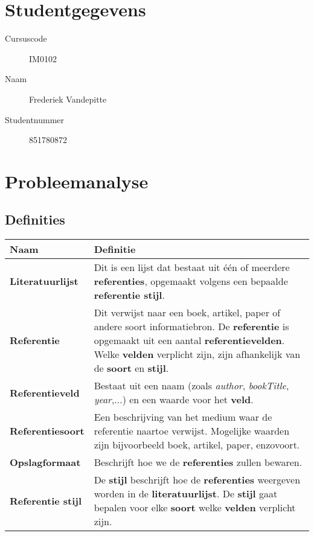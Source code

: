 \documentclass[a4paper]{article}
\begin{document}
\pagestyle{fancy}

\section*{Studentgegevens}
\begin{description}
	\item [Cursuscode] IM0102
	\item [Naam] Frederiek Vandepitte 
	\item [Studentnummer] 851780872 
\end{description}

\section{Probleemanalyse}
\subsection{Definities}
\begin{tabularx}{\textwidth}{ | l | X |}
	\hline
	\textbf{Naam} & \textbf{Definitie}\\ \hline
	\textbf{Literatuurlijst} & Dit is een lijst dat bestaat uit één of meerdere \textbf{referenties}, opgemaakt volgens een bepaalde \textbf{referentie stijl}.\\ \hline
	\textbf{Referentie} & Dit verwijst naar een boek, artikel, paper of andere soort informatiebron. De \textbf{referentie} is opgemaakt uit een aantal \textbf{referentievelden}. Welke \textbf{velden} verplicht zijn, zijn afhankelijk van de \textbf{soort} en \textbf{stijl}.\\ \hline
	\textbf{Referentieveld} & Bestaat uit een naam (zoals \emph{author}, \emph{bookTitle}, \emph{year},...) en een waarde voor het \textbf{veld}. \\ \hline
	\textbf{Referentiesoort} & Een beschrijving van het medium waar de referentie naartoe verwijst. Mogelijke waarden zijn bijvoorbeeld boek, artikel, paper, enzovoort.\\ \hline
	\textbf{Opslagformaat} & Beschrijft hoe we de \textbf{referenties} zullen bewaren.\\ \hline
	\textbf{Referentie stijl} & De \textbf{stijl} beschrijft hoe de \textbf{referenties} weergeven worden in de \textbf{literatuurlijst}. De \textbf{stijl} gaat bepalen voor elke \textbf{soort} welke \textbf{velden} verplicht zijn.\\ \hline
\end{tabularx}
\end{document}
